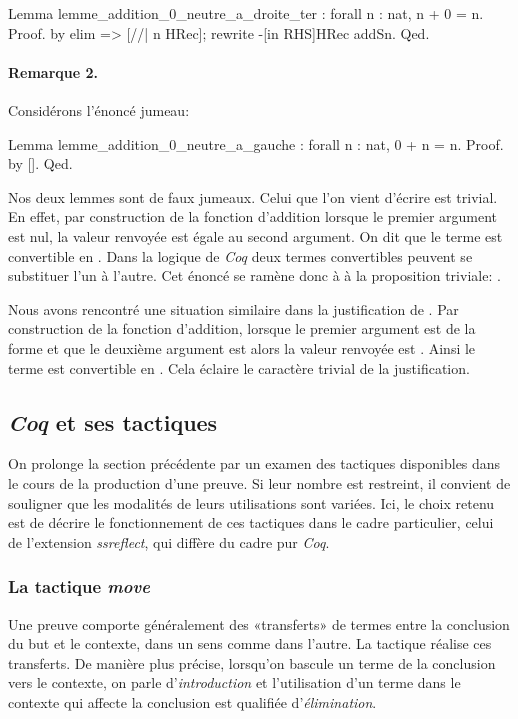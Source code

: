 \documentclass[a4paper,10pt]{article}
\begin{document}
\begin{coq}[]
Lemma lemme_addition_0_neutre_a_droite_ter : forall n : nat, n + 0 = n.
Proof.
  by elim => [//| n HRec]; rewrite -[in RHS]HRec addSn.
Qed.
\end{coq}

\paragraph*{Remarque 2.}
\label{sec:orga575213}
Considérons l'énoncé jumeau:
\begin{coq}[]
Lemma lemme_addition_0_neutre_a_gauche : forall n : nat, 0 + n = n.
Proof.
  by [].
Qed.
\end{coq}

Nos deux lemmes sont de faux jumeaux.  Celui que l'on vient d'écrire est trivial.  En effet, par
construction de la fonction d'addition lorsque le premier argument est nul, la valeur renvoyée est égale au
second argument.  On dit que le terme  est convertible en .  Dans la logique de \emph{Coq} deux
termes convertibles peuvent se substituer l'un à l'autre.  Cet énoncé se ramène donc à à la proposition
triviale: .

Nous avons rencontré une situation similaire dans la justification de .
Par construction de la fonction d'addition, lorsque le premier argument est de la forme  et que le
deuxième argument est  alors la valeur renvoyée est .  Ainsi le terme  est
convertible en .  Cela éclaire le caractère trivial de la justification.

\subsection{\emph{Coq} et ses tactiques}
\label{sec:org33b785e}
On prolonge la section précédente par un examen des tactiques disponibles dans le cours de la production
d'une preuve.  Si leur nombre est restreint, il convient de souligner que les modalités de leurs
utilisations sont variées. Ici, le choix retenu est de décrire le fonctionnement de ces tactiques dans le
cadre particulier, celui de l'extension \emph{ssreflect}, qui diffère du cadre pur \emph{Coq}.


\subsubsection{La tactique \emph{move}}
\label{sec:org97e189e}
Une preuve comporte généralement des «transferts» de termes entre la conclusion du but et le contexte, dans
un sens comme dans l'autre.  La tactique  réalise ces transferts.  De manière plus précise,
lorsqu'on bascule un terme de la conclusion vers le contexte, on parle d'\emph{introduction} et l'utilisation
d'un terme dans le contexte qui affecte la conclusion est qualifiée d'\emph{élimination}.
\end{document}
